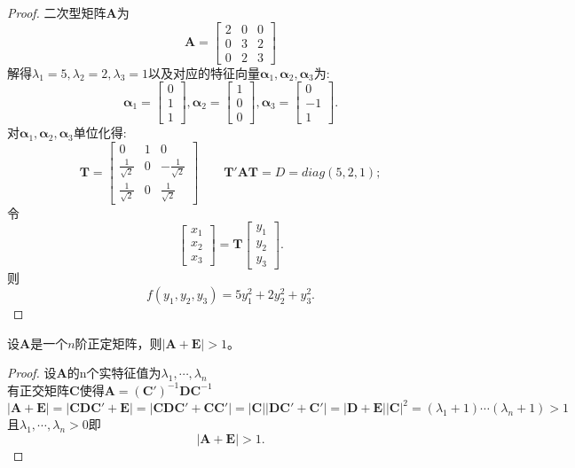 \documentclass[lang=cn,11pt,normal]{elegantbook}
\begin{document}
	\begin{proof}
		二次型矩阵$\boldsymbol{A}$为
		$$
		\boldsymbol{A}=
		\begin{bmatrix}
		2&0&0\\
		0&3&2\\
		0&2&3
		\end{bmatrix}
		$$
		解得$\lambda_1=5,\lambda_2=2,\lambda_3=1$以及对应的特征向量$\boldsymbol{\alpha}_1,\boldsymbol{\alpha}_2,\boldsymbol{\alpha}_3$为:
		$$
		\boldsymbol{\alpha}_1=
		\begin{bmatrix}
		0\\1\\1
		\end{bmatrix},
		\boldsymbol{\alpha}_2=
		\begin{bmatrix}
		1\\0\\0
		\end{bmatrix},
		\boldsymbol{\alpha}_3=
		\begin{bmatrix}
		0\\-1\\1
		\end{bmatrix}.
		$$
		对$\boldsymbol{\alpha}_1,\boldsymbol{\alpha}_2,\boldsymbol{\alpha}_3$单位化得:
		$$
		\boldsymbol{T}=
		\begin{bmatrix}
		0&1&0\\
		\frac{1}{\sqrt{2}}&0&-\frac{1}{\sqrt{2}}\\
		\frac{1}{\sqrt{2}}&0&\frac{1}{\sqrt{2}}
		\end{bmatrix}
		\qquad\boldsymbol{T}'\boldsymbol{AT}=D=diag(5,2,1);
		$$
		令
		$$
		\begin{bmatrix}
		x_1\\x_2\\x_3
		\end{bmatrix}
		=
		\boldsymbol{T}
		\begin{bmatrix}
		y_1\\y_2\\y_3
		\end{bmatrix}.
		$$
		则\\
		$$f(y_1,y_2,y_3)=5y_1^2+2y_2^2+y_3^2.$$
	\end{proof}
	\begin{exercise}
		设$\boldsymbol{A}$是一个$n$阶正定矩阵，则$|\boldsymbol{A}+\boldsymbol{E}|>1$。
	\end{exercise}
	\begin{proof}
		设$\boldsymbol{A}$的n个实特征值为$\lambda_1,\cdots,\lambda_n$
		\\有正交矩阵$\boldsymbol{C}$使得$\boldsymbol{A}=(\boldsymbol{C}')^{-1}\boldsymbol{D}\boldsymbol{C}^{-1}$
		$$
		|\boldsymbol{A}+\boldsymbol{E}|=|\boldsymbol{CDC}'+\boldsymbol{E}|=|\boldsymbol{CDC}'+\boldsymbol{CC}'|=|\boldsymbol{C}||\boldsymbol{DC}'+\boldsymbol{C}'|=|\boldsymbol{D}+\boldsymbol{E}||\boldsymbol{C}|^2=(\lambda_1+1)\cdots(\lambda_n+1)>1
		$$
		且$\lambda_1,\cdots,\lambda_n>0$即
		$$
		|\boldsymbol{A}+\boldsymbol{E}|>1.
		$$
	\end{proof}
\end{document}
